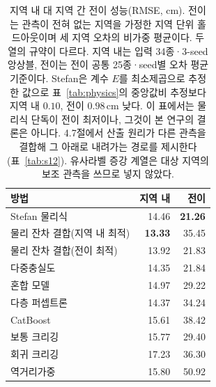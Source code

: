 \documentclass[10pt,twocolumn]{article}
\newcommand{\tabhead}[1]{\textbf{#1}}
\begin{document}
\begin{table}[H]
\centering
\footnotesize
\caption{지역 내 대 지역 간 전이 성능(RMSE, cm). 전이는 관측이 전혀 없는 지역을 가정한 지역 단위 홀드아웃이며 세 지역 오차의 비가중 평균이다. 두 열의 규약이 다르다. 지역 내는 입력 34종·3-seed 앙상블, 전이는 전이 공통 25종·seed별 오차 평균 기준이다. Stefan은 계수 $E$를 최소제곱으로 추정한 값으로 표~\ref{tab:physics}의 중앙값비 추정보다 지역 내 $0.10$, 전이 $0.98\,\mathrm{cm}$ 낮다. 이 표에서는 물리식 단독이 전이 최저이나, 그것이 본 연구의 결론은 아니다. 4.7절에서 산출 원리가 다른 관측을 결합해 그 아래로 내려가는 경로를 제시한다(표~\ref{tab:s12}). 유사라벨 증강 계열은 대상 지역의 보조 관측을 쓰므로 넣지 않았다.}
\label{tab:transfer}
\begin{tabular}{@{}lrr@{}}
\toprule
\tabhead{방법} & \tabhead{지역 내} & \tabhead{전이} \\
\midrule
Stefan 물리식 & 14.46 & \textbf{21.26} \\
물리 잔차 결합(지역 내 최적) & \textbf{13.33} & 35.45 \\
물리 잔차 결합(전이 최적) & 13.92 & 21.83 \\
다중충실도 & 14.35 & 21.84 \\
혼합 모델 & 14.97 & 29.22 \\
다층 퍼셉트론 & 14.37 & 34.24 \\
CatBoost & 15.61 & 38.42 \\
보통 크리깅 & 15.77 & 29.40 \\
회귀 크리깅 & 17.23 & 36.30 \\
역거리가중 & 15.80 & 50.92 \\
\bottomrule
\end{tabular}
\end{table}
\end{document}

